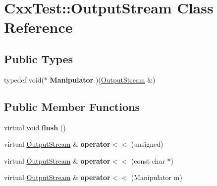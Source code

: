 \hypertarget{classCxxTest_1_1OutputStream}{\section{Cxx\-Test\-:\-:Output\-Stream Class Reference}
\label{classCxxTest_1_1OutputStream}
}
\subsection*{Public Types}
\begin{DoxyCompactItemize}
\item 
\hypertarget{classCxxTest_1_1OutputStream_aea784ebaae63978d47df0766071da443}{typedef void($\ast$ {\bfseries Manipulator} )(\hyperlink{classCxxTest_1_1OutputStream}{Output\-Stream} \&)}\label{classCxxTest_1_1OutputStream_aea784ebaae63978d47df0766071da443}

\end{DoxyCompactItemize}
\subsection*{Public Member Functions}
\begin{DoxyCompactItemize}
\item 
\hypertarget{classCxxTest_1_1OutputStream_a27f2d882527104fbff307b5f9207cccb}{virtual void {\bfseries flush} ()}\label{classCxxTest_1_1OutputStream_a27f2d882527104fbff307b5f9207cccb}

\item 
\hypertarget{classCxxTest_1_1OutputStream_a0a53aa682823db1e208c8cbd39f1dde0}{virtual \hyperlink{classCxxTest_1_1OutputStream}{Output\-Stream} \& {\bfseries operator$<$$<$} (unsigned)}\label{classCxxTest_1_1OutputStream_a0a53aa682823db1e208c8cbd39f1dde0}

\item 
\hypertarget{classCxxTest_1_1OutputStream_a0bb9c3aedc040ab9a8ab2f2e3ff47143}{virtual \hyperlink{classCxxTest_1_1OutputStream}{Output\-Stream} \& {\bfseries operator$<$$<$} (const char $\ast$)}\label{classCxxTest_1_1OutputStream_a0bb9c3aedc040ab9a8ab2f2e3ff47143}

\item 
\hypertarget{classCxxTest_1_1OutputStream_ae05ffefaf0092c1c2b6ebc93c605b620}{virtual \hyperlink{classCxxTest_1_1OutputStream}{Output\-Stream} \& {\bfseries operator$<$$<$} (Manipulator m)}\label{classCxxTest_1_1OutputStream_ae05ffefaf0092c1c2b6ebc93c605b620}

\end{DoxyCompactItemize}
